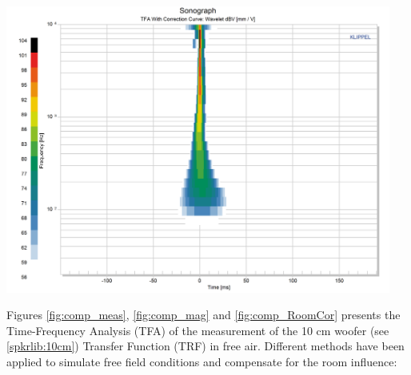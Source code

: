 \documentclass{report}
\begin{document}
\begin{minipage}{0.331\textwidth}
\begin{center}
	\includegraphics[width=0.95\textwidth]{RoomComp/Sonograph_RoomCor} 
    \captionsetup{hypcap=false} 
	\label{fig:comp_RoomCor}
\end{center}
\end{minipage}

\vspace{0.1cm}

Figures \ref{fig:comp_meas}, \ref{fig:comp_mag} and \ref{fig:comp_RoomCor} presents the Time-Frequency Analysis (TFA) of the measurement of the 10 cm woofer (see \ref{spkrlib:10cm}) Transfer Function (TRF) in free air. Different methods have been applied to simulate free field conditions and compensate for the room influence:
\end{document}
